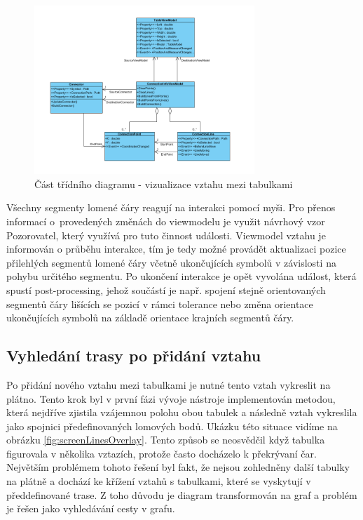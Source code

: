 \documentclass[czech,bachelor,public,dept460,male,oneside]{diploma}
\begin{document}
		\begin{figure}[!h]
			\centering
			\includegraphics[width=0.74\textwidth]{Figures/EditorVztahy}
			\caption{Část třídního diagramu - vizualizace vztahu mezi tabulkami}
			\label{fig:classDiagMovePolyline}
		\end{figure}
		
		Všechny segmenty lomené čáry reagují na interakci pomocí myši. Pro přenos informací o~provedených změnách do viewmodelu je využit návrhový vzor Pozorovatel, který využívá pro tuto činnost události. Viewmodel vztahu je informován o průběhu interakce, tím je tedy možné provádět aktualizaci pozice přilehlých segmentů lomené čáry včetně ukončujících symbolů v závislosti na pohybu určitého segmentu. Po ukončení interakce je opět vyvolána událost, která spustí post-processing, jehož součástí je např. spojení stejně orientovaných segmentů čáry lišících se pozicí v rámci tolerance nebo změna orientace ukončujících symbolů na základě orientace krajních segmentů čáry.
		
	\subsection{Vyhledání trasy po přidání vztahu} \label{secAStar}
	Po přidání nového vztahu mezi tabulkami je nutné tento vztah vykreslit na plátno. Tento krok byl v první fázi vývoje nástroje implementován metodou, která nejdříve zjistila vzájemnou polohu obou tabulek a následně vztah vykreslila jako spojnici předefinovaných lomových bodů. Ukázku této situace vidíme na obrázku \ref{fig:screenLinesOverlay}. Tento způsob se neosvědčil když tabulka figurovala v několika vztazích, protože často docházelo k překrývaní čar. Největším problémem tohoto řešení byl fakt, že nejsou zohledněny další tabulky na plátně a dochází ke křížení vztahů s tabulkami, které se vyskytují v předdefinované trase. Z toho důvodu je diagram transformován na graf a problém je řešen jako vyhledávání cesty v grafu.
	
\end{document}

